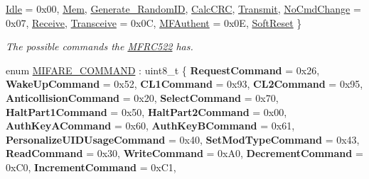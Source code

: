 \begin{DoxyCompactItemize}
\mbox{\hyperlink{class_m_f_r_c522_abf038692c9cf33ed59b44a612e6ed1c7a2e3acc1de05b7e99481861470dd4ec67}{Idle}} = 0x00, 
\mbox{\hyperlink{class_m_f_r_c522_abf038692c9cf33ed59b44a612e6ed1c7a331b0d7cac5bb0e112f68aed6eb709d0}{Mem}}, 
\mbox{\hyperlink{class_m_f_r_c522_abf038692c9cf33ed59b44a612e6ed1c7a6bda04e01a6d5df97488787f375776a2}{Generate\+\_\+\+Random\+ID}}, 
\mbox{\hyperlink{class_m_f_r_c522_abf038692c9cf33ed59b44a612e6ed1c7a6f1fb41caaad33cafce719dad14c98dc}{Calc\+C\+RC}}, 
\newline
\mbox{\hyperlink{class_m_f_r_c522_abf038692c9cf33ed59b44a612e6ed1c7ad8058fe92d6fe81aa1ca962cf940e700}{Transmit}}, 
\mbox{\hyperlink{class_m_f_r_c522_abf038692c9cf33ed59b44a612e6ed1c7a5283b4437854b195a315565bf14622fd}{No\+Cmd\+Change}} = 0x07, 
\mbox{\hyperlink{class_m_f_r_c522_abf038692c9cf33ed59b44a612e6ed1c7a212875378684ee3dad1574c0965750d2}{Receive}}, 
\mbox{\hyperlink{class_m_f_r_c522_abf038692c9cf33ed59b44a612e6ed1c7a1e5adf1be49c609a5d222b5bc79606d8}{Transceive}} = 0x0C, 
\newline
\mbox{\hyperlink{class_m_f_r_c522_abf038692c9cf33ed59b44a612e6ed1c7a626e32787ed32c2544a228e6c5004344}{M\+F\+Authent}} = 0x0E, 
\mbox{\hyperlink{class_m_f_r_c522_abf038692c9cf33ed59b44a612e6ed1c7a056870dfe674f9999e9c5c0191181d53}{Soft\+Reset}}
 \}
\begin{DoxyCompactList}\small\item\em The possible commands the \mbox{\hyperlink{class_m_f_r_c522}{M\+F\+R\+C522}} has. \end{DoxyCompactList}\item 
enum \mbox{\hyperlink{class_m_f_r_c522_a79bd44224bb1ad85e28a0937a6715818}{M\+I\+F\+A\+R\+E\+\_\+\+C\+O\+M\+M\+A\+ND}} \+: uint8\+\_\+t \{ \newline
{\bfseries Request\+Command} = 0x26, 
{\bfseries Wake\+Up\+Command} = 0x52, 
{\bfseries C\+L1\+Command} = 0x93, 
{\bfseries C\+L2\+Command} = 0x95, 
\newline
{\bfseries Anticollision\+Command} = 0x20, 
{\bfseries Select\+Command} = 0x70, 
{\bfseries Halt\+Part1\+Command} = 0x50, 
{\bfseries Halt\+Part2\+Command} = 0x00, 
\newline
{\bfseries Auth\+Key\+A\+Command} = 0x60, 
{\bfseries Auth\+Key\+B\+Command} = 0x61, 
{\bfseries Personalize\+U\+I\+D\+Usage\+Command} = 0x40, 
{\bfseries Set\+Mod\+Type\+Command} = 0x43, 
\newline
{\bfseries Read\+Command} = 0x30, 
{\bfseries Write\+Command} = 0x\+A0, 
{\bfseries Decrement\+Command} = 0x\+C0, 
{\bfseries Increment\+Command} = 0x\+C1, 

\end{DoxyCompactItemize}
